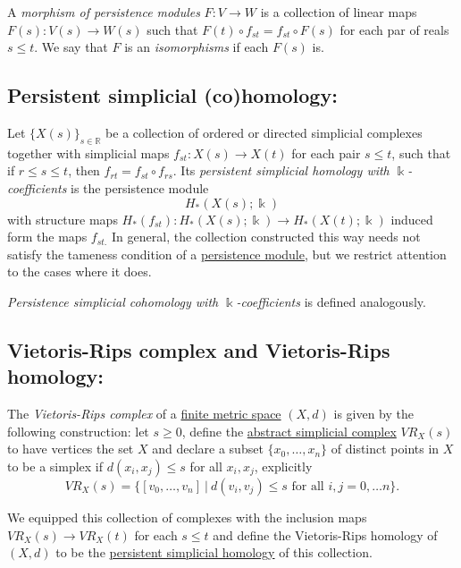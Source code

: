 \documentclass{amsart}
\begin{document}
	A \textit{morphism of persistence modules} $F : V \to W$ is a collection of linear maps $F(s) : V(s) \to W(s)$ such that $F(t) \circ f_{st} = f_{st} \circ F(s)$ for each par of reals $s \leq t$.	We say that $F$ is an \textit{isomorphisms} if each $F(s)$ is.
	
	\subsection*{Persistent simplicial (co)homology:} \label{persistent simplicial (co)homology}
	
	Let $\{X(s)\}_{s \in \mathbb R} $ be a collection of ordered or directed simplicial complexes together with simplicial maps $f_{st} : X(s) \to X(t)$ for each pair $s \leq t$, such that if $r \leq s \leq t$, then $f_{rt} = f_{st} \circ f_{rs}$. Its \textit{persistent simplicial homology with $\Bbbk$-coefficients} is the persistence module
	\begin{equation*}
	H_*(X(s); \Bbbk)
	\end{equation*}
	with structure maps $H_*(f_{st}) : H_*(X(s); \Bbbk) \to H_*(X(t); \Bbbk)$ induced form the maps $f_{st.}$ In general, the collection constructed this way needs not satisfy the tameness condition of a \hyperref[persistence module]{persistence module}, but we restrict attention to the cases where it does.
	
	\textit{Persistence simplicial cohomology with $\Bbbk$-coefficients} is defined analogously.
	
	\subsection*{Vietoris-Rips complex and Vietoris-Rips homology:} \label{vietoris-rips complex and vietoris-rips homology}
	
	The \textit{Vietoris-Rips complex} of a \hyperref[finite metric spaces and point clouds]{finite metric space} $(X, d)$ is given by the following construction: let $s \geq 0$, define the {\hyperref[abstract simplicial complex]{abstract simplicial complex}} $VR_X(s)$ to have vertices the set $X$ and declare a subset $\{x_0, \dots, x_n\}$ of distinct points in $X$ to be a simplex if $d(x_i, x_j) \leq s$ for all $x_i, x_j$, explicitly
	\begin{equation*}
	VR_X(s) = \big\{ [v_0,\dots,v_n]\ |\ d(v_i,v_j) \leq s \text{ for all } i,j = 0,\dots n \big\}.
	\end{equation*}
	
	We equipped this collection of complexes with the inclusion maps $VR_X(s) \to VR_X(t)$ for each $s \leq t$ and define the Vietoris-Rips homology of $(X, d)$ to be the \hyperref[persistent simplicial (co)homology]{persistent simplicial homology} of this collection.
	
\end{document}
